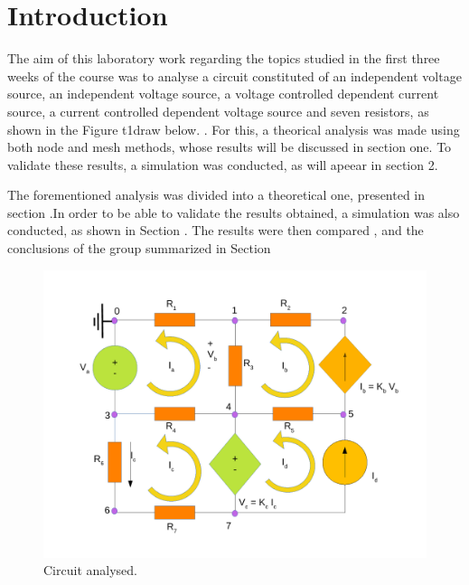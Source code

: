 \section{Introduction}
\label{introduction}

The aim of this laboratory work regarding the topics studied in the first three weeks of the course was to analyse a circuit constituted of an independent voltage source, an independent voltage source, a voltage controlled dependent current source, a current controlled dependent voltage source and seven resistors, as shown in the Figure t1draw below.
. For this, a theorical analysis was made using both node and mesh methods, whose results will be discussed in section one. To validate these results, a simulation was conducted, as will apeear in section 2.


The forementioned analysis was divided into a theoretical one, presented in section .In order to be able to validate the results obtained, a simulation was also conducted, as shown in Section . The results were then compared , and the conclusions of the group summarized in Section 


\begin{figure}[h] \centering
\includegraphics[width=1.0\linewidth]{t1draw.pdf}
\caption{Circuit analysed.}
\label{t1draw}
\end{figure}


